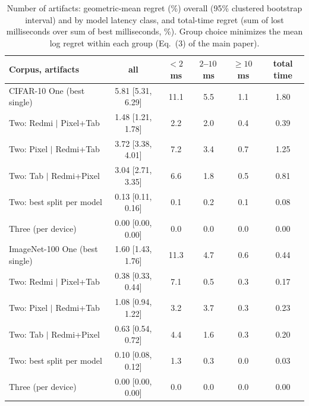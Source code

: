 \begin{table}[!t]
\centering
\caption{Number of artifacts: geometric-mean regret (\%) overall (95\% clustered bootstrap interval) and by model latency class, and total-time regret (sum of lost milliseconds over sum of best milliseconds, \%). Group choice minimizes the mean log regret within each group (Eq.~(3) of the main paper).}
\label{tab:kart}
\footnotesize
\setlength{\tabcolsep}{3pt}
\begin{tabular}{@{}lccccc@{}}
\toprule
\textbf{Corpus, artifacts} & all & $<2$\,ms & $2$--$10$\,ms & $\geq10$\,ms & total time \\
\midrule
CIFAR-10 One (best single) & 5.81 [5.31, 6.29] & 11.1 & 5.5 & 1.1 & 1.80 \\
 Two: Redmi $|$ Pixel+Tab & 1.48 [1.21, 1.78] & 2.2 & 2.0 & 0.4 & 0.39 \\
 Two: Pixel $|$ Redmi+Tab & 3.72 [3.38, 4.01] & 7.2 & 3.4 & 0.7 & 1.25 \\
 Two: Tab $|$ Redmi+Pixel & 3.04 [2.71, 3.35] & 6.6 & 1.8 & 0.5 & 0.81 \\
 Two: best split per model & 0.13 [0.11, 0.16] & 0.1 & 0.2 & 0.1 & 0.08 \\
 Three (per device) & 0.00 [0.00, 0.00] & 0.0 & 0.0 & 0.0 & 0.00 \\
\midrule
ImageNet-100 One (best single) & 1.60 [1.43, 1.76] & 11.3 & 4.7 & 0.6 & 0.44 \\
 Two: Redmi $|$ Pixel+Tab & 0.38 [0.33, 0.44] & 7.1 & 0.5 & 0.3 & 0.17 \\
 Two: Pixel $|$ Redmi+Tab & 1.08 [0.94, 1.22] & 3.2 & 3.7 & 0.3 & 0.23 \\
 Two: Tab $|$ Redmi+Pixel & 0.63 [0.54, 0.72] & 4.4 & 1.6 & 0.3 & 0.20 \\
 Two: best split per model & 0.10 [0.08, 0.12] & 1.3 & 0.3 & 0.0 & 0.03 \\
 Three (per device) & 0.00 [0.00, 0.00] & 0.0 & 0.0 & 0.0 & 0.00 \\
\bottomrule
\end{tabular}
\end{table}

